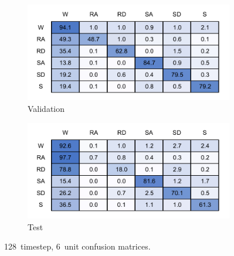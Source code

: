 \begin{figure}[!hbt]
     \centering
    \begin{subfigure}{.45\textwidth}
    \centering
        \includegraphics[width=\textwidth]{content/4-LSTM_Behaviour/results/conf_matricies/Training_128x6_NT.pdf}
        \caption{Validation}
        \label{fig:full_model_conf_matrix_training_128x6}
    \end{subfigure}
    \begin{subfigure}{.45\textwidth}
    \centering
        \includegraphics[width=\textwidth]{content/4-LSTM_Behaviour/results/conf_matricies/Test_128x6_NT.pdf}
        \caption{Test}
        \label{fig:full_model_conf_matrix_test_128x6}
    \end{subfigure}
    \caption{128~timestep, 6~unit confusion matrices.}
    \label{fig:128x6_full_model_confusion_matrix}
\end{figure}

